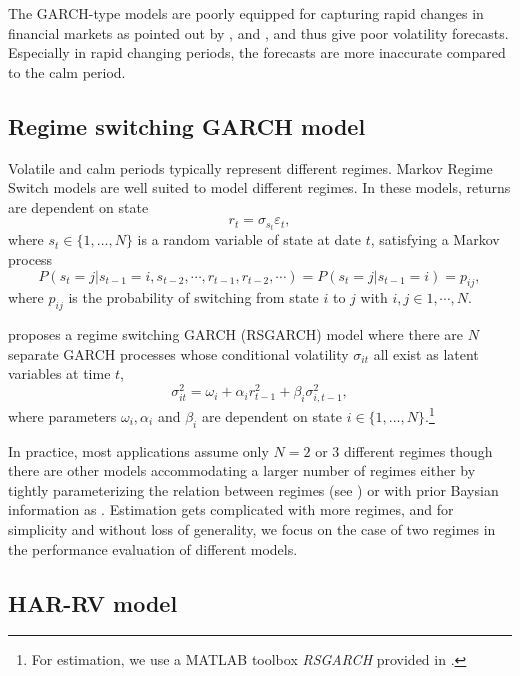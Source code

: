 \documentclass[preprint,12pt,authoryear]{elsarticle}
\begin{document}
The GARCH-type models are poorly equipped for capturing rapid changes in financial markets as pointed out by \cite{Andersen2003}, \cite{Hansen2012} and \cite{Smetanina2021}, and thus give poor volatility forecasts. Especially in rapid changing periods, the forecasts are more inaccurate compared to the calm period.

\subsection{Regime switching GARCH model}

Volatile and calm periods typically represent different regimes. Markov Regime Switch models are well suited to model different regimes.
In these models, returns are dependent on state
\begin{equation}
	r_t=\sigma_{s_t}\varepsilon_t,
\end{equation}
where $s_t\in \{1,\dots,N\}$ is a random variable of state at date $t$, satisfying a Markov process
\begin{equation}
	P(s_t=j|s_{t-1}=i,s_{t-2},\cdots,r_{t-1},r_{t-2},\cdots)=P(s_t=j|s_{t-1}=i)=p_{ij},
\end{equation}
where $p_{ij}$ is the probability of switching from state $i$ to $j$ with $i,j\in 1,\cdots,N$.

\cite{Haas2004} proposes a regime switching GARCH (RSGARCH) model where there are $N$ separate GARCH processes whose conditional volatility $\sigma_{it}$ all exist as latent variables at time $t$,
\begin{equation}
	\sigma_{it}^2=\omega_i+\alpha_i r_{t-1}^2+\beta_i \sigma_{i,t-1}^2,
\end{equation}
where parameters $\omega_i, \alpha_i$ and $\beta_i$ are dependent on state $i\in \{1,\dots,N\}$.\footnote{For estimation, we use a MATLAB toolbox \textit{RSGARCH} provided in \cite{Chuffart2017}.}

In practice, most applications assume only $N=2$ or $3$ different regimes though there are other models accommodating a larger number of regimes either by tightly parameterizing the relation between regimes (see \cite{Calvet2004}) or with prior Baysian information as \cite{Sims2006}. Estimation gets complicated with more regimes, and for simplicity and without loss of generality, we focus on the case of two regimes in the performance evaluation of different models.

\subsection{HAR-RV model}
\end{document}
